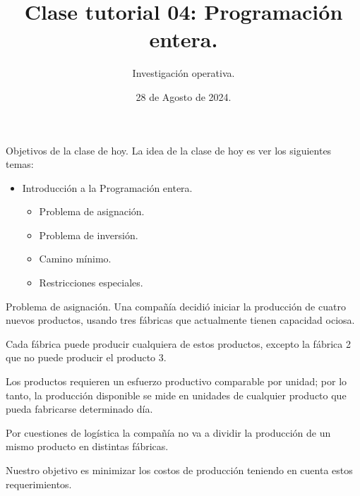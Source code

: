 \documentclass{beamer}
\title[]{Clase tutorial 04: Programación entera.}
\date{28 de Agosto de 2024.}
\author[]{ Investigación operativa.
  }
\institute{Universidad de San Andrés}
\begin{document}
\maketitle

\begin{frame}{Objetivos de la clase de hoy.}
  La idea de la clase de hoy es ver los siguientes temas:
  \begin{itemize}
    \item Introducción a la Programación entera.
      \begin{itemize}
        \item Problema de asignación.
        \item Problema de inversión.
        \item Camino mínimo.
        \item Restricciones especiales.
      \end{itemize}
  \end{itemize}
\end{frame}


\begin{frame}[fragile]{Problema de asignación.}
  Una compañía decidió iniciar la producción de cuatro nuevos productos,
  usando tres fábricas que actualmente tienen capacidad ociosa. 


  Cada fábrica puede producir cualquiera de estos productos, excepto la fábrica 2 que no puede producir el producto 3.
  \pause

  Los productos requieren un esfuerzo productivo comparable por unidad; por lo tanto, la
  producción disponible se mide en unidades de cualquier producto que pueda
  fabricarse determinado día.

  Por cuestiones de logística la compañía no va a dividir la producción de un mismo producto en distintas fábricas.
  
  Nuestro objetivo es minimizar los costos de producción teniendo en cuenta estos requerimientos.
\end{frame}
\end{document}
